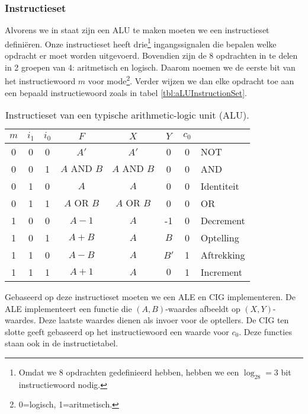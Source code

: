 \subsubsection{Instructieset}
\label{sss:aLUInstructionSet}
Alvorens we in staat zijn een ALU te maken moeten we een instructieset defini\"eren. Onze instructieset heeft drie\footnote{Omdat we 8 opdrachten gedefinieerd hebben, hebben we een $\log_28=3$ bit instructiewoord nodig.} ingangssignalen die bepalen welke opdracht er moet worden uitgevoerd. Bovendien zijn de 8 opdrachten in te delen in 2 groepen van 4: aritmetisch en logisch. Daarom noemen we de eerste bit van het instructiewoord $m$ voor mode\footnote{0=logisch, 1=aritmetisch.}. Verder wijzen we dan elke opdracht toe aan een bepaald instructiewoord zoals in tabel \ref{tbl:aLUInstructionSet}.
\begin{table}[hbt]
\centering
\begin{tabular}{ccc|c|ccc|l}
$m$&$i_1$&$i_0$&$F$&$X$&$Y$&$c_0$&\\\hline
0&0&0&$A'$&$A'$&0&0&NOT\\
0&0&1&$A\mbox{ AND }B$&$A\mbox{ AND }B$&0&0&AND\\
0&1&0&$A$&$A$&0&0&Identiteit\\
0&1&1&$A\mbox{ OR }B$&$A\mbox{ OR }B$&0&0&OR\\
1&0&0&$A-1$&$A$&-1&0&Decrement\\
1&0&1&$A+B$&$A$&$B$&0&Optelling\\
1&1&0&$A-B$&$A$&$B'$&1&Aftrekking\\
1&1&1&$A+1$&$A$&$0$&1&Increment\\
\end{tabular}
\caption{Instructieset van een typische arithmetic-logic unit (ALU).}
\end{table}
Gebaseerd op deze instructieset moeten we een ALE en CIG implementeren. De ALE implementeert een functie die $\left(A,B\right)$-waardes afbeeldt op $\left(X,Y\right)$-waardes. Deze laatste waardes dienen als invoer  voor de optellers. De CIG ten slotte geeft gebaseerd op het instructiewoord een waarde voor $c_0$. Deze functies staan ook in de instructietabel.

